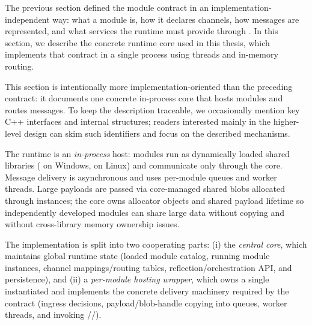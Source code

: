 The previous section defined the module contract in an implementation-independent way: what a module is, how it declares channels, how messages are represented, and what services the runtime must provide through . In this section, we describe the concrete runtime core used in this thesis, which implements that contract in a single process using threads and in-memory routing.

This section is intentionally more implementation-oriented than the preceding contract: it documents one concrete in-process core that hosts modules and routes messages.
To keep the description traceable, we occasionally mention key C++ interfaces and internal structures; readers interested mainly in the higher-level design can skim such identifiers and focus on the described mechanisms.

The runtime is an \emph{in-process} host: modules run as dynamically loaded shared libraries ( on Windows,  on Linux) and communicate only through the core.
Message delivery is asynchronous and uses per-module queues and worker threads.
Large payloads are passed via core-managed shared blobs allocated through  instances; the core owns allocator objects and shared payload lifetime so independently developed modules can share large data without copying and without cross-library memory ownership issues.

The implementation is split into two cooperating parts:
(i) the \emph{central core}, which maintains global runtime state (loaded module catalog, running module instances, channel mappings/routing tables, reflection/orchestration API, and persistence), and
(ii) a \emph{per-module hosting wrapper}, which owns a single instantiated  and implements the concrete delivery machinery required by the contract (ingress decisions, payload/blob-handle copying into queues, worker threads, and invoking //).


